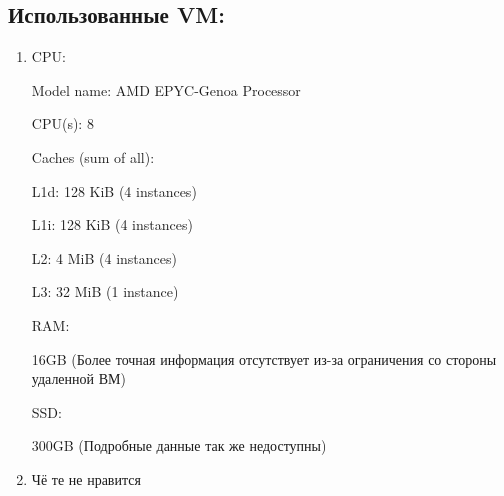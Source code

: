 \subsection {Использованные VM:}

\begin{enumerate}
  \item\label{vm:first}     
  CPU:

      Model name:                AMD EPYC-Genoa Processor

      CPU(s):                      8

      Caches (sum of all):         

      L1d:                       128 KiB (4 instances)

      L1i:                       128 KiB (4 instances)

      L2:                        4 MiB (4 instances)

      L3:                        32 MiB (1 instance)
      

    RAM:

      16GB (Более точная информация отсутствует из-за ограничения со стороны удаленной ВМ)

    SSD:
    
      300GB (Подробные данные так же недоступны)

   



  \item Чё те не нравится
  
\end{enumerate}